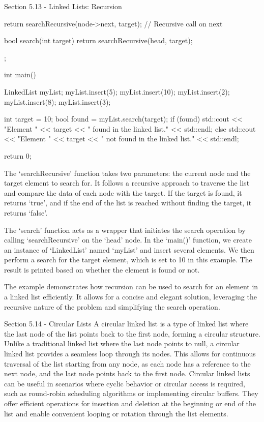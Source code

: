 \begin{notes}{Section 5.13 - Linked Lists: Recursion}
\begin{highlight}
\begin{code}[C++]
{{            return searchRecursive(node->next, target);  // Recursive call on next
        }
    
        bool search(int target) {
            return searchRecursive(head, target);
        }
    };
    
    int main() {
        LinkedList myList;
        myList.insert(5);
        myList.insert(10);
        myList.insert(2);
        myList.insert(8);
        myList.insert(3);
    
        int target = 10;
        bool found = myList.search(target);
        if (found) {
            std::cout << "Element " << target << " found in the linked list." << std::endl;
        } else {
            std::cout << "Element " << target << " not found in the linked list." << std::endl;
        }
    
        return 0;
    }
    \end{code}
        The `searchRecursive' function takes two parameters: the current node and the target element to search for. It follows a recursive approach to traverse the list and compare the data of each node with the target. If the target is found, it returns `true', and if the end of the list is reached without finding the target, it returns `false'.
    
        The `search' function acts as a wrapper that initiates the search operation by calling `searchRecursive' on the `head' node. In the `main()' function, we create an instance of `LinkedList' named `myList' and insert several elements. We then perform a search for the target element, which is set to 10 in this example. The result is printed based on whether the 
        element is found or not.
    
        The example demonstrates how recursion can be used to search for an element in a linked list efficiently. It allows for a concise and elegant solution, leveraging the recursive nature of the problem and simplifying the search operation.
    \end{highlight}
\end{notes}

\begin{notes}{Section 5.14 - Circular Lists}
    A circular linked list is a type of linked list where the last node of the list points back to the first node, forming a circular structure. Unlike a traditional linked list where the last node points to null, a circular linked list provides a seamless loop through its nodes. This allows for continuous traversal of the list starting from any node, 
    as each node has a reference to the next node, and the last node points back to the first node. Circular linked lists can be useful in scenarios where cyclic behavior or circular access is required, such as round-robin scheduling algorithms or implementing circular buffers. They offer efficient operations for insertion and deletion at the beginning 
    or end of the list and enable convenient looping or rotation through the list elements.
\end{notes}

